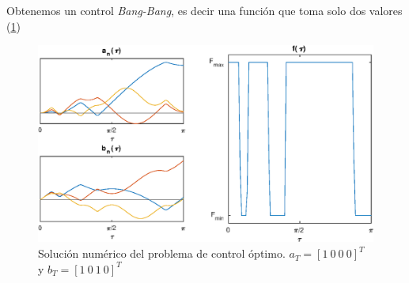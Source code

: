 Obtenemos un control \emph{Bang-Bang}, es decir una función que toma solo dos valores (\ref{figbang})



\begin{figure}[]
    \centering
    \includegraphics[scale=0.7]{fig/img03.eps}
    \caption{Solución numérico del problema de control óptimo. $a_T = [1 \ 0 \ 0 \ 0]^T$ y 
    $b_T = [1 \ 0 \ 1 \ 0]^T$}
    \label{figbang}
\end{figure}


